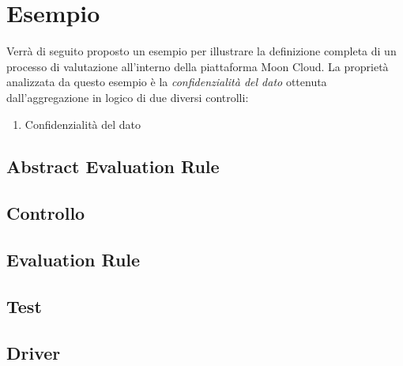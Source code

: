 \documentclass[../main.tex]{subfiles}
\begin{document}
\section{Esempio}

Verrà di seguito proposto un esempio per illustrare la definizione completa di un processo di valutazione all'interno della piattaforma Moon Cloud.
La proprietà analizzata da questo esempio è la \textit{confidenzialità del dato} ottenuta dall'aggregazione in  logico di due diversi controlli:
\begin{enumerate}
    \item{Confidenzialità del dato }
\end{enumerate}

\subsection{Abstract Evaluation Rule}
\subsection{Controllo}
\subsection{Evaluation Rule}
\subsection{Test}
\subsection{Driver}
\end{document}
